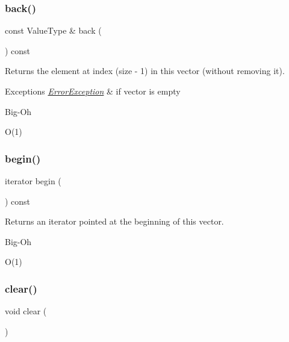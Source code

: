 \subsubsection{\texorpdfstring{back()}{back()}\hspace{0.1cm}{\footnotesize\ttfamily [2/2]}}
{\footnotesize\ttfamily const Value\+Type \& back (\begin{DoxyParamCaption}{ }\end{DoxyParamCaption}) const}



Returns the element at index (size -\/ 1) in this vector (without removing it). 


\begin{DoxyExceptions}{Exceptions}
{\em \mbox{\hyperlink{classErrorException}{Error\+Exception}}} & if vector is empty \\
\hline
\end{DoxyExceptions}
\begin{DoxyRefDesc}{Big-\/\+Oh}
\item[\mbox{\hyperlink{BigOh__BigOh000107}{Big-\/\+Oh}}]O(1) \end{DoxyRefDesc}
\mbox{\label{classVector_a0c62c15c8ed609e7e5e9518cf5f5c712}} 
\subsubsection{\texorpdfstring{begin()}{begin()}}
{\footnotesize\ttfamily iterator begin (\begin{DoxyParamCaption}{ }\end{DoxyParamCaption}) const\hspace{0.3cm}{\ttfamily [inline]}}



Returns an iterator pointed at the beginning of this vector. 

\begin{DoxyRefDesc}{Big-\/\+Oh}
\item[\mbox{\hyperlink{BigOh__BigOh000153}{Big-\/\+Oh}}]O(1) \end{DoxyRefDesc}
\mbox{\label{classVector_ac8bb3912a3ce86b15842e79d0b421204}} 
\subsubsection{\texorpdfstring{clear()}{clear()}}
{\footnotesize\ttfamily void clear (\begin{DoxyParamCaption}{ }\end{DoxyParamCaption})}



